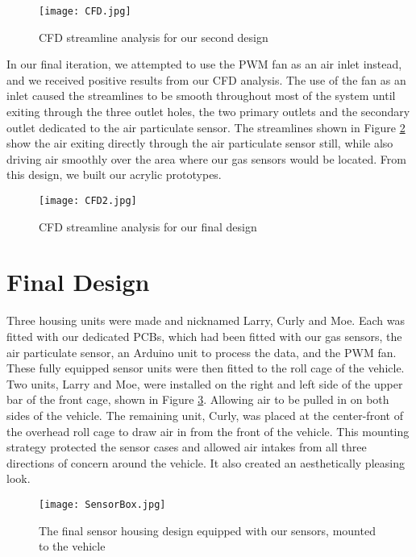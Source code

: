 \begin{figure}[H]
	\centering
	\texttt{[image: CFD.jpg]}
	\caption{CFD streamline analysis for our second design}
	\label{fig:CFD2}
\end{figure}

In our final iteration, we attempted to use the PWM fan as an air inlet instead, and we received positive results from our CFD analysis. The use of the fan as an inlet caused the streamlines to be smooth throughout most of the system until exiting through the three outlet holes, the two primary outlets and the secondary outlet dedicated to the air particulate sensor. The streamlines shown in Figure \ref{fig:CFD3} show the air exiting directly through the air particulate sensor still, while also driving air smoothly over the area where our gas sensors would be located. From this design, we built our acrylic prototypes. 

\begin{figure}[H]
	\centering
	\texttt{[image: CFD2.jpg]}
	\caption{CFD streamline analysis for our final design}
	\label{fig:CFD3}
\end{figure}

\section{Final Design}
Three housing units were made and nicknamed Larry, Curly and Moe. Each was fitted with our dedicated PCBs, which had been fitted with our gas sensors, the air particulate sensor, an Arduino unit to process the data, and the PWM fan. These fully equipped sensor units were then fitted to the roll cage of the vehicle. Two units, Larry and Moe, were installed on the right and left side of the upper bar of the front cage, shown in Figure \ref{fig:Box}. Allowing air to be pulled in on both sides of the vehicle. The remaining unit, Curly, was placed at the center-front of the overhead roll cage to draw air in from the front of the vehicle. This mounting strategy protected the sensor cases and allowed air intakes from all three directions of concern around the vehicle. It also created an aesthetically pleasing look.

\begin{figure}[H]
	\centering
	\texttt{[image: SensorBox.jpg]}
	\caption{The final sensor housing design equipped with our sensors, mounted to the vehicle}
	\label{fig:Box}
\end{figure}
